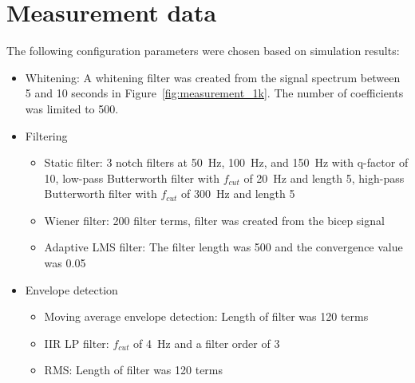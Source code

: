 \section{Measurement data}
The following configuration parameters were chosen based on simulation results:
\begin{itemize}
    \item Whitening: A whitening filter was created from the signal spectrum between 5 and 10 seconds in Figure~\ref{fig:measurement_1k}. The number of coefficients was limited to 500.
    \item Filtering
    \begin{itemize}
        \item Static filter: 3 notch filters at \SI{50}{\hertz}, \SI{100}{\hertz}, and \SI{150}{\hertz} with q-factor of 10, low-pass Butterworth filter with $f_{cut}$ of \SI{20}{\hertz} and length 5, high-pass Butterworth filter with $f_{cut}$ of \SI{300}{\hertz} and length 5
        \item Wiener filter: 200 filter terms, filter was created from the bicep signal
        \item Adaptive LMS filter: The filter length was 500 and the convergence value was 0.05
    \end{itemize}
    \item Envelope detection
    \begin{itemize}
        \item Moving average envelope detection: Length of filter was 120 terms
        \item IIR LP filter: $f_{cut}$ of \SI{4}{\hertz} and a filter order of 3
        \item RMS: Length of filter was 120 terms
    \end{itemize}
\end{itemize}


